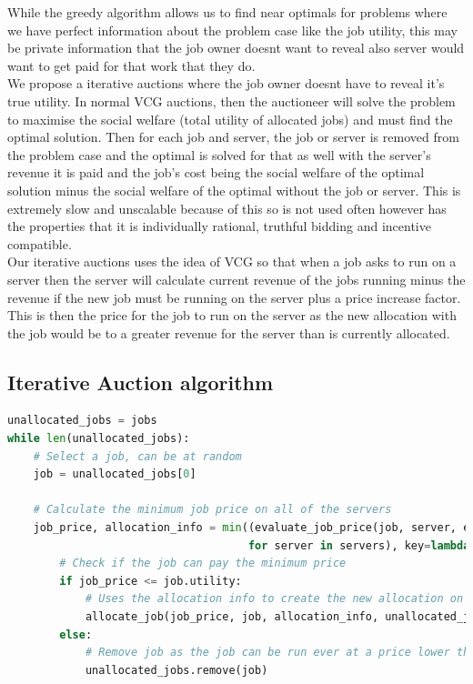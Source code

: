 While the greedy algorithm allows us to find near optimals for problems where we have perfect information about the
problem case like the job utility, this may be private information that the job owner doesnt want to reveal also
server would want to get paid for that work that they do. \\
We propose a iterative auctions where the job owner doesnt have to reveal it's true utility. In normal VCG auctions,
then the auctioneer will solve the problem to maximise the social welfare (total utility of allocated jobs) and
must find the optimal solution. Then for each job and server, the job or server is removed from the problem case and the
optimal is solved for that as well with the server's revenue it is paid and the job's cost being the social welfare of
the optimal solution minus the social welfare of the optimal without the job or server. This is extremely slow and
unscalable because of this so is not used often however has the properties that it is individually rational, truthful
bidding and incentive compatible. \\
Our iterative auctions uses the idea of VCG so that when a job asks to run on a server then the server will calculate
current revenue of the jobs running minus the revenue if the new job must be running on the server plus a price increase
factor. This is then the price for the job to run on the server as the new allocation with the job would be to a greater
revenue for the server than is currently allocated.

\subsection{Iterative Auction algorithm}\label{subsec:iterative-auctions-algorithm}
\begin{lstlisting}[language=Python]
unallocated_jobs = jobs
while len(unallocated_jobs):
    # Select a job, can be at random
    job = unallocated_jobs[0]

    # Calculate the minimum job price on all of the servers
    job_price, allocation_info = min((evaluate_job_price(job, server, epsilon=epsilon)
                                     for server in servers), key=lambda bid: bid[0])
        # Check if the job can pay the minimum price
        if job_price <= job.utility:
            # Uses the allocation info to create the new allocation on the selected server
            allocate_job(job_price, job, allocation_info, unallocated_jobs)
        else:
            # Remove job as the job can be run ever at a price lower than the job's true utility
            unallocated_jobs.remove(job)
\end{lstlisting}

